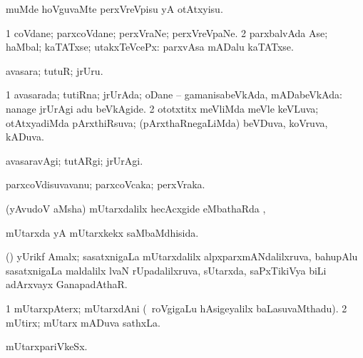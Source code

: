 {{\noindent
\gl{\pagu}
\expl{}
\bmng
{} muMde hoVguvaMte perxVreVpisu yA otAtxyisu. 
\emng
\eentry

\bentry
{} 
\gl{\nA}
\expl{}
\bmng
\bnum
\num{1} coVdane; parxcoVdane; perxVraNe; perxVreVpaNe. 
\num{2} parxbalvAda Ase; haMbal; kaTATxse; utakxTeVcePx:  parxvAsa mADalu kaTATxse. 
\enum
\emng
\eentry

\bentry
{} 
\gl{\nA}
\expl{}
\bmng
avasara; tutuR; jrUru. 
\emng
\eentry

\bentry
{} 
\gl{\gu}
\bmng
\bnum
\num{1} avasarada; tutiRna; jrUrAda; oDane -- gamanisabeVkAda, mADabeVkAda:  nanage jrUrAgi adu beVkAgide. 
\num{2} ototxtitx meVliMda meVle keVLuva; otAtxyadiMda pArxthiRsuva; (pArxthaRnegaLiMda) beVDuva, koVruva, kADuva. 
\enum
\emng
\eentry

\bentry
{} 
\gl{\kirxvi}
\expl{}
\bmng
avasaravAgi; tutARgi; jrUrAgi. 
\emng
\eentry

\bentry
{} 
\gl{\nA}
\expl{}
\bmng
parxcoVdisuvavanu; parxcoVcaka; perxVraka. 
\emng
\eentry

\bentry
{}
\gl{\saMkiSx}
\expl{}
\bmng
{} 
\emng
\eentry

\bentry
{}
\gl{\saupa}
\expl{}
\bmng
(yAvudoV aMsha) mUtarxdalilx hecAcxgide eMbathaRda \upa, \udA\  
\emng
\eentry

\bentry
{} 
\gl{\gu}
\expl{}
\bmng
mUtarxda yA mUtarxkekx saMbaMdhisida. 
\emng
\eentry

\bentry
{}
\gl{\nA}
\expl{}
\bmng
(\jiVra) yUrikf Amalx; sasatxnigaLa mUtarxdalilx alpxparxmANdalilxruva, bahupAlu sasatxnigaLa maldalilx lvaN rUpadalilxruva,  sUtarxda, saPxTikiVya biLi adArxvayx GanapadAthaR. 
\emng
\eentry

\bentry
{} 
\gl{\nA}
\expl{}
\bmng
\bnum
\num{1} mUtarxpAterx; mUtarxdAni (\sA\ roVgigaLu hAsigeyalilx baLasuvaMthadu). 
\num{2} mUtirx; mUtarx mADuva sathxLa. 
\enum
\emng
\eentry

\bentry
{} 
\gl{\nA}
\bmng
mUtarxpariVkeSx. 
\emng
\eentry

}}
